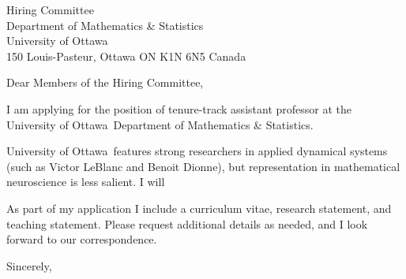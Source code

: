 \documentclass[11pt,a4paper]{letter}
\begin{document}
\def\School{University of Ottawa}
\begin{letter}
{Hiring Committee\\
Department of Mathematics \& Statistics\\
University of Ottawa\\
150 Louis-Pasteur, Ottawa ON K1N 6N5 Canada}


\opening{Dear Members of the Hiring Committee,}

I am applying for the position of tenure-track assistant professor at the \School~Department of Mathematics \& Statistics. 



\School~features strong researchers in applied dynamical systems (such as Victor LeBlanc and Benoit Dionne), but representation in mathematical neuroscience is less salient. I will 



As part of my application I include a curriculum vitae, research statement, and teaching statement. Please request additional details as needed, and I look forward to our correspondence.

\closing{Sincerely,}
\end{letter}
\end{document}

